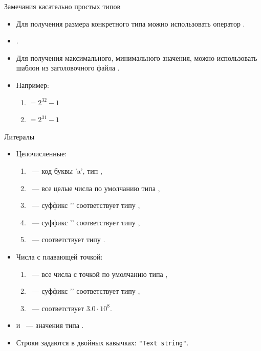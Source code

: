 \documentclass[aspectration=1610,t]{beamer}
\begin{document}
\begin{frame}[fragile]{Замечания касательно простых типов}
    \begin{itemize}
        \item Для получения размера конкретного типа можно использовать оператор .
        \item {}.
        \item Для получения максимального, минимального значения,
            можно использовать шаблон из заголовочного файла . 
        \item Например:
            \begin{enumerate}
                \item {} $= 2^{32} - 1$
                \item {} $= 2^{31} - 1$
            \end{enumerate}
    \end{itemize}
\end{frame}

\begin{frame}[fragile]{Литералы}
\begin{itemize}
    \item Целочисленные:
        \begin{enumerate}
            \item {}~--- код буквы 'a', тип ,
            \item {} ~--- все целые числа по умолчанию типа ,
            \item {}~--- суффикс '' соответствует типу ,
            \item {}~--- суффикс '' соответствует типу ,
            \item {}~--- соответствует типу .
        \end{enumerate}

    \item Числа с плавающей точкой:
        \begin{enumerate}
            \item {}~--- 
                все числа с точкой по умолчанию типа ,
            \item {}~--- суффикс '' соответствует типу 
                ,
            \item {}~--- соответствует $3.0\cdot 10^{8}$.
        \end{enumerate}
    \item {} и ~--- значения типа .

    \item Строки задаются в двойных кавычках: \verb!"Text string"!.

\end{itemize}
\end{frame}
\end{document}
